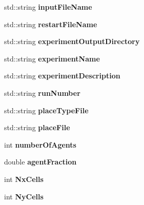 \begin{DoxyCompactItemize}
\item 
\mbox{\label{classparameters_ab71abccfb209eabd432a00795499ec73}} 
std\+::string {\bfseries input\+File\+Name}
\item 
\mbox{\label{classparameters_aad32dd614fb6ec7e35d2164f67ce22ad}} 
std\+::string {\bfseries restart\+File\+Name}
\item 
\mbox{\label{classparameters_a3c7681fc6d8a470be404d7348300959a}} 
std\+::string {\bfseries experiment\+Output\+Directory}
\item 
\mbox{\label{classparameters_a59c8ffe41c719b4b68757eb9651c6f78}} 
std\+::string {\bfseries experiment\+Name}
\item 
\mbox{\label{classparameters_ac181c3087e5a2945c211c5a3184762b1}} 
std\+::string {\bfseries experiment\+Description}
\item 
\mbox{\label{classparameters_ae945433af4b08140a4347394621a2c50}} 
std\+::string {\bfseries run\+Number}
\item 
\mbox{\label{classparameters_a728e3c84b03479cb797b6a4cc65f430e}} 
std\+::string {\bfseries place\+Type\+File}
\item 
\mbox{\label{classparameters_a4e84504d57f0c0de42e905909653937e}} 
std\+::string {\bfseries place\+File}
\item 
\mbox{\label{classparameters_a15db93a0b107790da98ca6a71c6dc9cb}} 
int {\bfseries number\+Of\+Agents}
\item 
\mbox{\label{classparameters_a8cb2359c2d104816f42a4696f345ce89}} 
double {\bfseries agent\+Fraction}
\item 
\mbox{\label{classparameters_aa2686e17e7a4926a9adc6d64a4a0a152}} 
int {\bfseries Nx\+Cells}
\item 
\mbox{\label{classparameters_a64f626139fe19e6798233080ab95e4bf}} 
int {\bfseries Ny\+Cells}
\item 

\end{DoxyCompactItemize}
